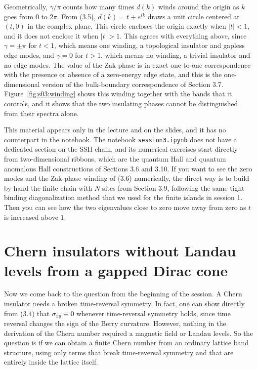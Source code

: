 Geometrically, $\gamma/\pi$ counts how many times $d(k)$ winds around the origin as $k$ goes from $0$
to $2\pi$. From (3.5), $d(k) = t + e^{ik}$ draws a unit circle centered at $(t,0)$ in the complex
plane. This circle encloses the origin exactly when $|t|<1$, and it does not enclose it when $|t|>1$.
This agrees with everything above, since $\gamma = \pm\pi$ for $t<1$, which means one winding, a
topological insulator and gapless edge modes, and $\gamma = 0$ for $t>1$, which means no winding, a
trivial insulator and no edge modes. The value of the Zak phase is in exact one-to-one correspondence
with the presence or absence of a zero-energy edge state, and this is the one-dimensional version of
the bulk-boundary correspondence of Section 3.7. Figure~\ref{fig:s03:winding} shows this winding
together with the bands that it controls, and it shows that the two insulating phases cannot be
distinguished from their spectra alone.



This material appears only in the lecture and on the slides, and it has no counterpart in the
notebook. The notebook \texttt{session3.ipynb} does not have a dedicated section on the SSH chain,
and its numerical exercises start directly from two-dimensional ribbons, which are the quantum Hall
and quantum anomalous Hall constructions of Sections 3.6 and 3.10. If you want to see the zero modes
and the Zak-phase winding of (3.6) numerically, the direct way is to build by hand the finite chain
with $N$ sites from Section 3.9, following the same tight-binding diagonalization method that we used
for the finite islands in session 1. Then you can see how the two eigenvalues close to zero move away
from zero as $t$ is increased above $1$.

\section{Chern insulators without Landau levels from a gapped Dirac cone}

Now we come back to the question from the beginning of the session. A Chern insulator needs a broken
time-reversal symmetry. In fact, one can show directly from (3.4) that $\sigma_{xy}\equiv 0$ whenever
time-reversal symmetry holds, since time reversal changes the sign of the Berry curvature. However,
nothing in the derivation of the Chern number required a magnetic field or Landau levels. So the
question is if we can obtain a finite Chern number from an ordinary lattice band structure, using only
terms that break time-reversal symmetry and that are entirely inside the lattice itself.

